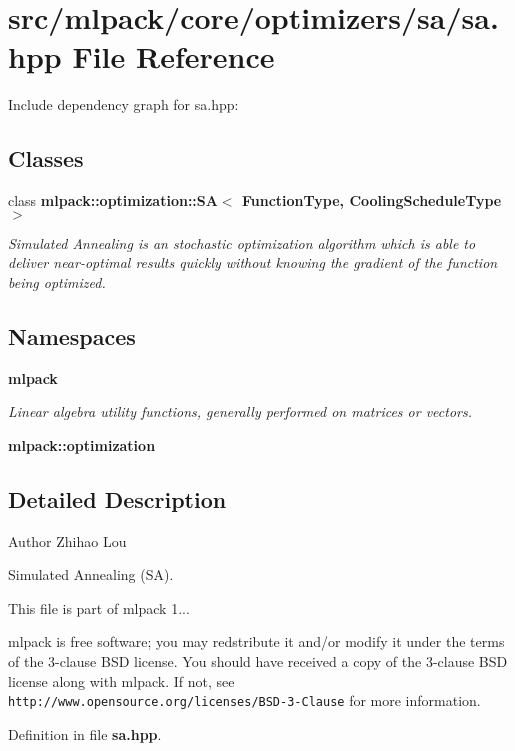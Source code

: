 \section{src/mlpack/core/optimizers/sa/sa.hpp File Reference}
\label{sa_8hpp}
Include dependency graph for sa.\-hpp\-:
\subsection*{Classes}
\begin{DoxyCompactItemize}
\item 
class {\bf mlpack\-::optimization\-::\-S\-A$<$ Function\-Type, Cooling\-Schedule\-Type $>$}
\begin{DoxyCompactList}\small\item\em Simulated Annealing is an stochastic optimization algorithm which is able to deliver near-\/optimal results quickly without knowing the gradient of the function being optimized. \end{DoxyCompactList}\end{DoxyCompactItemize}
\subsection*{Namespaces}
\begin{DoxyCompactItemize}
\item 
{\bf mlpack}
\begin{DoxyCompactList}\small\item\em Linear algebra utility functions, generally performed on matrices or vectors. \end{DoxyCompactList}\item 
{\bf mlpack\-::optimization}
\end{DoxyCompactItemize}


\subsection{Detailed Description}
\begin{DoxyAuthor}{Author}
Zhihao Lou
\end{DoxyAuthor}
Simulated Annealing (S\-A).

This file is part of mlpack 1...

mlpack is free software; you may redstribute it and/or modify it under the terms of the 3-\/clause B\-S\-D license. You should have received a copy of the 3-\/clause B\-S\-D license along with mlpack. If not, see {\tt http\-://www.\-opensource.\-org/licenses/\-B\-S\-D-\/3-\/\-Clause} for more information. 

Definition in file {\bf sa.\-hpp}.

